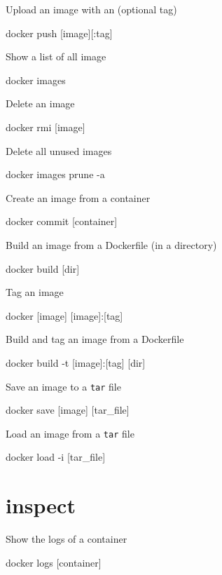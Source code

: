 \documentclass{refcard}
\begin{document}
Upload an image with an (optional tag)
\begin{ttyenv}
docker push [image][:tag]
\end{ttyenv}

Show a list of all image
\begin{ttyenv}
docker images
\end{ttyenv}

Delete an image
\begin{ttyenv}
docker rmi [image]
\end{ttyenv}

Delete all unused images
\begin{ttyenv}
docker images prune -a
\end{ttyenv}

Create an image from a container
\begin{ttyenv}
docker commit [container]
\end{ttyenv}

Build an image from a Dockerfile (in a directory)
\begin{ttyenv}
docker build [dir]
\end{ttyenv}

Tag an image
\begin{ttyenv}
docker [image] [image]:[tag]
\end{ttyenv}

Build and tag an image from a Dockerfile
\begin{ttyenv}
docker build -t [image]:[tag] [dir]
\end{ttyenv}

Save an image to a \verb|tar| file
\begin{ttyenv}
docker save [image] [tar_file]
\end{ttyenv}

Load an image from a \verb|tar| file
\begin{ttyenv}
docker load -i [tar_file]
\end{ttyenv}


\section{inspect}

Show the logs of a container
\begin{ttyenv}
docker logs [container]
\end{ttyenv}
\end{document}
